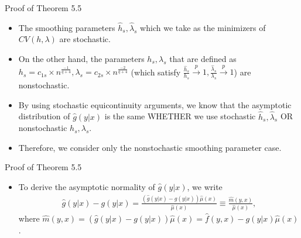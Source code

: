 \documentclass[xcolor=svgnames,dvipdfmx,cjk]{beamer}
\theoremstyle{example}
\begin{document}
\begin{frame}{Proof of Theorem 5.5}
  \begin{itemize}
    \item The smoothing parameters $\hat{h}_s, \hat{\lambda}_s$ 
          which we take as the minimizers of $CV(h, \lambda)$ are stochastic.
    \item On the other hand, the parameters $h_s, \lambda_s$ 
          that are defined as 
          $h_s = c_{1s} \times n^{\frac{-1}{q+4}}, \lambda_s = c_{2s} \times n^{\frac{-2}{q+4}}$
          (which satisfy $\frac{\hat{h}_s}{h_s} \xrightarrow{p} 1, \frac{\hat{\lambda}_s}{\lambda_s} \xrightarrow{p} 1$)
          are nonstochastic.
    \item By using stochastic equicontinuity arguments, 
          we know that the asymptotic distribution of $\hat{g}(y|x)$ is the same
          WHETHER we use stochastic $\hat{h}_s, \hat{\lambda}_s$ 
          OR nonstochastic $h_s, \lambda_s$.
    \item Therefore, we consider only the nonstochastic smoothing parameter case. 
  \end{itemize} 
\end{frame}

\begin{frame}{Proof of Theorem 5.5}
  \begin{itemize}
    \item To derive the asymptotic normality of $\hat{g}(y|x)$, we write
          \begin{align*}
            \hat{g}(y|x) - g(y|x) 
            =
            \frac{(\hat{g}(y|x)-g(y|x))\hat{\mu}(x)}{\hat{\mu}(x)}
            \equiv
            \frac{\hat{m}(y,x)}{\hat{\mu}(x)},
          \end{align*}
          where 
          $\hat{m}(y,x) = (\hat{g}(y|x)-g(y|x))\hat{\mu}(x) = \hat{f}(y,x) - g(y|x)\hat{\mu}(x)$. 
  \end{itemize}
\end{frame}
\end{document}
